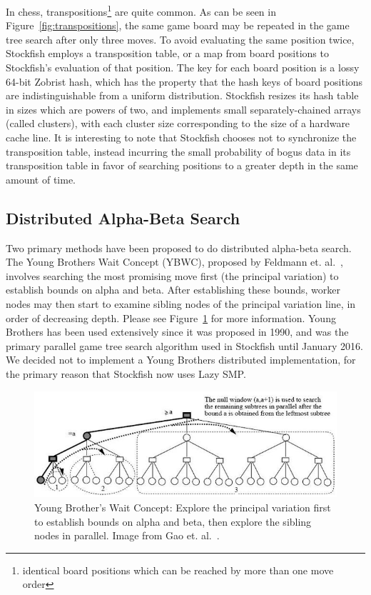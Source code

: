 \documentclass{article}
\begin{document}
In chess, transpositions\footnote{identical board positions which can
be reached by more than one move order} are quite common.
As can be seen in Figure~\ref{fig:transpositions}, the same game board may be
repeated in the game tree search after only three moves.
To avoid evaluating the same position
twice, Stockfish employs a transposition table, or a map from board positions to
Stockfish's evaluation of that position. The key for each board position is a lossy 64-bit
Zobrist hash\cite{Zobrist}, which has the property that the hash keys of board
positions are 
indistinguishable from a uniform distribution. Stockfish resizes its hash table
in sizes which are powers of two, and implements small separately-chained arrays
(called clusters), with each cluster size corresponding to the size of a hardware
cache line.
It is interesting to note that Stockfish chooses not to synchronize the
transposition table, instead incurring
the small probability of bogus data in its transposition table in favor of
searching positions to a greater depth in the same amount of time.

\subsection{Distributed Alpha-Beta Search}
Two primary methods have been proposed to do distributed alpha-beta search. The
Young Brothers Wait Concept (YBWC), proposed by Feldmann et.
al.~\cite{YBWC:article}, involves searching the most
promising move first (the principal variation) to establish bounds on alpha and
beta. After establishing these bounds, worker nodes may then start to examine sibling
nodes of the principal variation line, in order of decreasing depth.
Please see Figure~\ref{fig:YBWC} for more information. Young Brothers has been used
extensively since it was proposed in 1990, and was the primary parallel game tree search algorithm used in
Stockfish until January 2016. We decided not to implement a Young Brothers
distributed implementation, for the primary reason that Stockfish now uses Lazy
SMP.

\begin{figure}[t]
	\includegraphics[width=\textwidth]{PVSplit}
	\caption{Young Brother's Wait Concept: Explore the principal variation
	first to establish bounds on alpha and beta, then explore the sibling
	nodes in parallel. Image from Gao et. al.~\cite{PVSplit:article}.}
	\label{fig:YBWC}
\end{figure}
\end{document}
